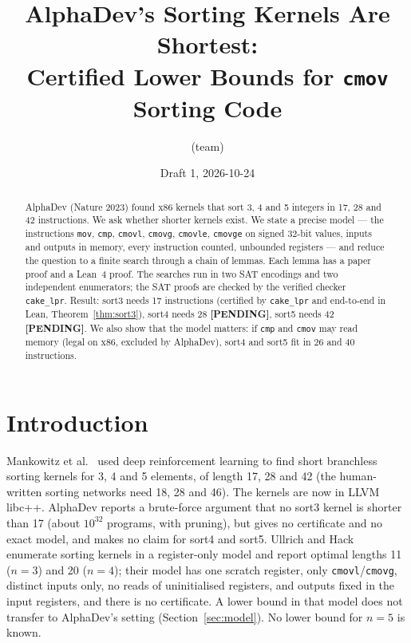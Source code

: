 \documentclass[11pt]{article}
\title{AlphaDev's Sorting Kernels Are Shortest:\\ Certified Lower Bounds for \texttt{cmov} Sorting Code}
\author{(team) }
\date{Draft 1, 2026-10-24}
\theoremstyle{remark}\newtheorem{remark}[theorem]{Remark}
\newcommand{\pending}{\textbf{[PENDING]}}
\begin{document}
\maketitle

\begin{abstract}
AlphaDev (Nature 2023) found x86 kernels that sort 3, 4 and 5 integers in 17, 28 and 42 instructions. We ask whether
shorter kernels exist. We state a precise model --- the instructions \texttt{mov}, \texttt{cmp}, \texttt{cmovl},
\texttt{cmovg}, \texttt{cmovle}, \texttt{cmovge} on signed 32-bit values, inputs and outputs in memory, every instruction
counted, unbounded registers --- and reduce the question to a finite search through a chain of lemmas. Each lemma has a
paper proof and a Lean~4 proof. The searches run in two SAT encodings and two independent enumerators; the SAT proofs are
checked by the verified checker \texttt{cake\_lpr}. Result: sort3 needs 17 instructions (certified by \texttt{cake\_lpr} and end-to-end in Lean, Theorem~\ref{thm:sort3}),
sort4 needs 28 \pending, sort5 needs 42 \pending. We also show that the model matters: if \texttt{cmp} and \texttt{cmov} may
read memory (legal on x86, excluded by AlphaDev), sort4 and sort5 fit in 26 and 40 instructions.
\end{abstract}

\section{Introduction}
Mankowitz et al.~\cite{alphadev} used deep reinforcement learning to find short branchless sorting kernels for 3, 4 and 5
elements, of length 17, 28 and 42 (the human-written sorting networks need 18, 28 and 46). The kernels are now in LLVM libc++.
AlphaDev reports a brute-force argument that no sort3 kernel is shorter than 17 (about $10^{32}$ programs, with pruning), but
gives no certificate and no exact model, and makes no claim for sort4 and sort5. Ullrich and Hack~\cite{ullrich} enumerate
sorting kernels in a register-only model and report optimal lengths 11 ($n=3$) and 20 ($n=4$); their model has one scratch
register, only \texttt{cmovl}/\texttt{cmovg}, distinct inputs only, no reads of uninitialised registers, and outputs fixed in
the input registers, and there is no certificate. A lower bound in
that model does not transfer to AlphaDev's setting (Section~\ref{sec:model}). No lower bound for $n=5$ is known.
\end{document}
